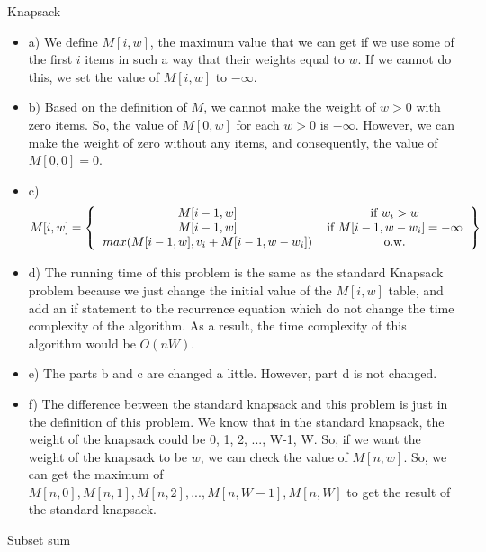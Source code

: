 \documentclass[12pt]{article}
\newenvironment{solution}[2][Solution]{\begin{trivlist}
\item[\hskip \labelsep {\bfseries #1}]}{\end{trivlist}}
\newenvironment{problem}[2][Problem]{\begin{trivlist}
\item[\hskip \labelsep {\bfseries #1}\hskip \labelsep {\bfseries #2.}]}{\end{trivlist}}
\begin{document}
\newpage
\begin{problem}{2}
Knapsack
\end{problem}

\begin{solution}{}
\begin{itemize}
\item a) We define $M[i,w]$, the maximum value that we can get if we use some of the 
first $i$ items in such a way that their weights equal to $w$. If we cannot do this,
we set the value of $M[i,w]$ to $-\infty$.

\item b) Based on the definition of $M$, we cannot make the weight of $w > 0$ with zero items.
So, the value of $M[0,w]$ for each $w>0$ is $-\infty$. However, we can make the weight of zero
without any items, and consequently, the value of $M[0,0]=0$.

\item c) 
\[ 
M[i,w]= \left \{
  \begin{tabular}{cc}
  $M[i-1,w]$ & if $w_i > w$ \\
  $M[i-1,w]$ & if $M[i-1,w-w_i] = -\infty$ \\
  $max(M[i-1,w], v_i + M[i-1,w-w_i])$ & o.w.
  \end{tabular}
\right \}
\]

\item d) The running time of this problem is the same as the standard Knapsack problem
because we just change the initial value of the $M[i,w]$ table, and add an if statement to the 
recurrence equation which do not change the time complexity of the algorithm. As a result,
the time complexity of this algorithm would be $O(nW)$.

\item e) The parts b and c are changed a little. However, part d is not changed.

\item f) The difference between the standard knapsack and this problem is just in the 
definition of this problem. We know that in the standard knapsack, the weight of the 
knapsack could be 0, 1, 2, ..., W-1, W. So, if we want the weight of the knapsack to
be $w$, we can check the value of $M[n,w]$. So, we can get the maximum of $M[n,0], 
M[n,1], M[n,2], ..., M[n,W-1], M[n,W]$ to get the result of the standard knapsack.
\end{itemize}
\end{solution}


\begin{problem}{3}
Subset sum
\end{problem}
\end{document}
